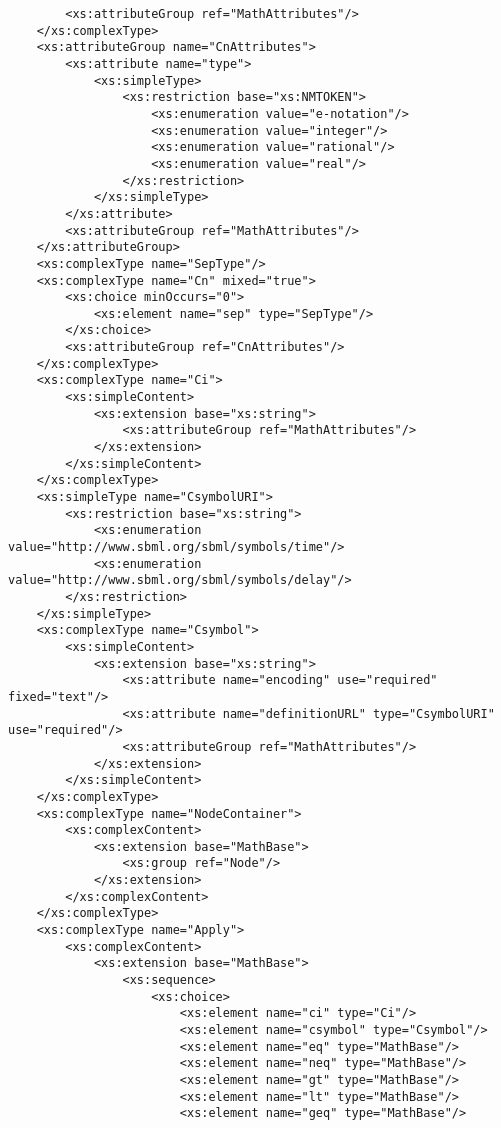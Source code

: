 \begin{footnotesize}
\begin{verbatim}
        <xs:attributeGroup ref="MathAttributes"/>
    </xs:complexType>
    <xs:attributeGroup name="CnAttributes">
        <xs:attribute name="type">
            <xs:simpleType>
                <xs:restriction base="xs:NMTOKEN">
                    <xs:enumeration value="e-notation"/>
                    <xs:enumeration value="integer"/>
                    <xs:enumeration value="rational"/>
                    <xs:enumeration value="real"/>
                </xs:restriction>
            </xs:simpleType>
        </xs:attribute>
        <xs:attributeGroup ref="MathAttributes"/>
    </xs:attributeGroup>
    <xs:complexType name="SepType"/>
    <xs:complexType name="Cn" mixed="true">
        <xs:choice minOccurs="0">
            <xs:element name="sep" type="SepType"/>
        </xs:choice>
        <xs:attributeGroup ref="CnAttributes"/>
    </xs:complexType>
    <xs:complexType name="Ci">
        <xs:simpleContent>
            <xs:extension base="xs:string">
                <xs:attributeGroup ref="MathAttributes"/>
            </xs:extension>
        </xs:simpleContent>
    </xs:complexType>
    <xs:simpleType name="CsymbolURI">
        <xs:restriction base="xs:string">
            <xs:enumeration value="http://www.sbml.org/sbml/symbols/time"/>
            <xs:enumeration value="http://www.sbml.org/sbml/symbols/delay"/>
        </xs:restriction>
    </xs:simpleType>
    <xs:complexType name="Csymbol">
        <xs:simpleContent>
            <xs:extension base="xs:string">
                <xs:attribute name="encoding" use="required" fixed="text"/>
                <xs:attribute name="definitionURL" type="CsymbolURI" use="required"/>
                <xs:attributeGroup ref="MathAttributes"/>
            </xs:extension>
        </xs:simpleContent>
    </xs:complexType>
    <xs:complexType name="NodeContainer">
        <xs:complexContent>
            <xs:extension base="MathBase">
                <xs:group ref="Node"/>
            </xs:extension>
        </xs:complexContent>
    </xs:complexType>
    <xs:complexType name="Apply">
        <xs:complexContent>
            <xs:extension base="MathBase">
                <xs:sequence>
                    <xs:choice>
                        <xs:element name="ci" type="Ci"/>
                        <xs:element name="csymbol" type="Csymbol"/>
                        <xs:element name="eq" type="MathBase"/>
                        <xs:element name="neq" type="MathBase"/>
                        <xs:element name="gt" type="MathBase"/>
                        <xs:element name="lt" type="MathBase"/>
                        <xs:element name="geq" type="MathBase"/>

\end{verbatim}
\end{footnotesize}
